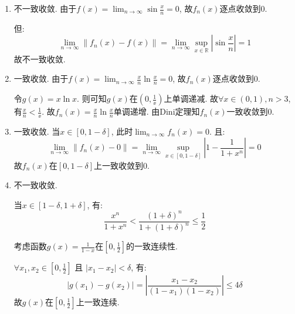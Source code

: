 \begin{solution}
    \begin{enumerate}
        \item 不一致收敛.
            由于\(f(x)=\lim_{n \to \infty} \sin \frac{x}{n} = 0\),
            故\(f_{n}(x)\)逐点收敛到\(0\).

            但:
            \[
                \lim_{n \to \infty} \left\lVert f_{n}(x) -
                f(x) \right\rVert
                = \lim_{n \to \infty} \sup_{x \in
                \mathbb{R}} \left\lvert \sin
                \frac{x}{n} \right\rvert
                = 1
            \]
            故不一致收敛.

        \item 一致收敛.
            由于\(f(x)=\lim_{n \to \infty} \frac{x}{n} \ln
            \frac{x}{n} = 0\),
            故\(f_{n}(x)\)逐点收敛到\(0\).

            令\(g(x)=x \ln x\). 则可知\(g(x)\)在\((0,\frac{1}{\ee})\)上单调递减.
            故\(\forall x \in (0,1), n > 3\), 有\(\frac{x}{n} <
            \frac{1}{\ee}\). 故\(f_{n}(x) = \frac{x}{n} \ln
            \frac{x}{n}\)单调递增. 由Dini定理知\(f_{n}(x)\)一致收敛到\(0\).

        \item 一致收敛.
            当\(x \in [0,1-\delta]\), 此时\(\lim_{n \to
            \infty}f_{n}(x) = 0\). 且:
            \[
                \lim_{n \to \infty}\left\lVert f_{n}(x) - 0
                \right\rVert
                = \lim_{n \to \infty} \sup_{x \in
                [0,1-\delta]} \left\vert 1 -
                \frac{1}{1+ x^{n}} \right\vert
                = 0
            \]
            故\(f_{n}(x)\)在\([0,1-\delta]\)上一致收敛到\(0\).

        \item 不一致收敛.

            当\(x \in [1-\delta,1+\delta]\), 有:
            \[
                \frac{x^{n}}{1 + x^{n}} < \frac{(1+\delta)^{n}}{1+
                (1+\delta)^{n}} \le \frac{1}{2}
            \]

            考虑函数\(g(x) = \frac{1}{1-x}\)在\([0,\frac{1}{2}]\)的一致连续性.

            \(\forall x_1, x_2 \in [0, \frac{1}{2}]\) 且
            \(\left\vert x_1 - x_2
            \right\vert < \delta\), 有:
            \[
                \left\vert g(x_1) - g(x_2) \right\vert
                = \left\vert \frac{x_1 -
                x_2}{(1-x_1)(1-x_2)} \right\vert
                \le 4 \delta
            \]
            故\(g(x)\)在\([0,\frac{1}{2}]\)上一致连续.


\end{enumerate}
\end{solution}
